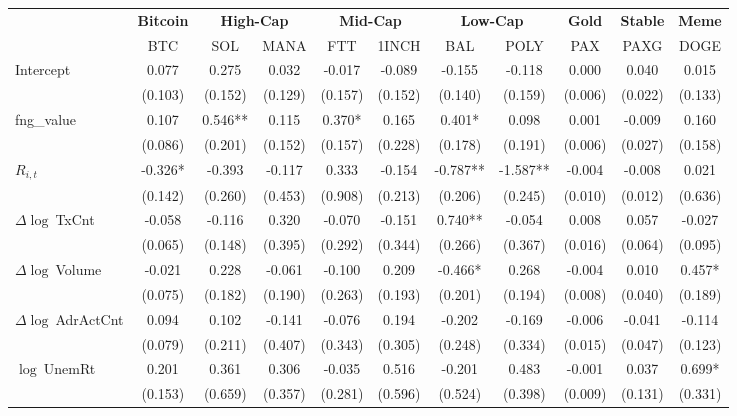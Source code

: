 \begin{table}[ht]
\centering
\scriptsize
\setlength{\tabcolsep}{4pt}
\begin{tabular}{l *{10}{c}}
\toprule
&\multicolumn{1}{c}{\textbf{Bitcoin}}&\multicolumn{2}{c}{\textbf{High-Cap}}&\multicolumn{2}{c}{\textbf{Mid-Cap}}&\multicolumn{2}{c}{\textbf{Low-Cap}}&\multicolumn{1}{c}{\textbf{Gold}}&\multicolumn{1}{c}{\textbf{Stable}}&\multicolumn{1}{c}{\textbf{Meme}}\\
\addlinespace
 & BTC & SOL & MANA & FTT & 1INCH & BAL & POLY & PAX & PAXG & DOGE \\
\midrule
Intercept & 0.077 & 0.275 & 0.032 & -0.017 & -0.089 & -0.155 & -0.118 & 0.000 & 0.040 & 0.015 \\
 & (0.103) & (0.152) & (0.129) & (0.157) & (0.152) & (0.140) & (0.159) & (0.006) & (0.022) & (0.133) \\
\addlinespace
fng_value & 0.107 & 0.546** & 0.115 & 0.370* & 0.165 & 0.401* & 0.098 & 0.001 & -0.009 & 0.160 \\
 & (0.086) & (0.201) & (0.152) & (0.157) & (0.228) & (0.178) & (0.191) & (0.006) & (0.027) & (0.158) \\
\addlinespace
$R_{i,t}$ & -0.326* & -0.393 & -0.117 & 0.333 & -0.154 & -0.787** & -1.587** & -0.004 & -0.008 & 0.021 \\
 & (0.142) & (0.260) & (0.453) & (0.908) & (0.213) & (0.206) & (0.245) & (0.010) & (0.012) & (0.636) \\
\addlinespace
$\Delta\log\ $TxCnt & -0.058 & -0.116 & 0.320 & -0.070 & -0.151 & 0.740** & -0.054 & 0.008 & 0.057 & -0.027 \\
 & (0.065) & (0.148) & (0.395) & (0.292) & (0.344) & (0.266) & (0.367) & (0.016) & (0.064) & (0.095) \\
\addlinespace
$\Delta\log\ $Volume & -0.021 & 0.228 & -0.061 & -0.100 & 0.209 & -0.466* & 0.268 & -0.004 & 0.010 & 0.457* \\
 & (0.075) & (0.182) & (0.190) & (0.263) & (0.193) & (0.201) & (0.194) & (0.008) & (0.040) & (0.189) \\
\addlinespace
$\Delta\log\ $AdrActCnt & 0.094 & 0.102 & -0.141 & -0.076 & 0.194 & -0.202 & -0.169 & -0.006 & -0.041 & -0.114 \\
 & (0.079) & (0.211) & (0.407) & (0.343) & (0.305) & (0.248) & (0.334) & (0.015) & (0.047) & (0.123) \\
\addlinespace
$\log\ $UnemRt & 0.201 & 0.361 & 0.306 & -0.035 & 0.516 & -0.201 & 0.483 & -0.001 & 0.037 & 0.699* \\
 & (0.153) & (0.659) & (0.357) & (0.281) & (0.596) & (0.524) & (0.398) & (0.009) & (0.131) & (0.331) \\

\end{tabular}
\end{table}
